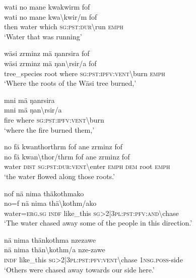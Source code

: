 \ea\label{ex:1:a3584}
wati no mane kwakwirm fof\\
\gll wati	no	mane	kwa{\textbackslash}kwir/m	fof\\
     then	water	which	\textsc{sg}:\textsc{pst}:\textsc{dur}{\textbackslash}run	\textsc{emph}\\
\glt `Water that was running'
\z

\ea\label{ex:1:a3585}
wäsi zrminz mä ŋanrsira fof\\
\gll wäsi	zrminz	mä	ŋan{\textbackslash}rsir/a	fof\\
     tree\_species	root	where	\textsc{sg}:\textsc{pst}:\textsc{ipfv}:\textsc{vent}{\textbackslash}burn	\textsc{emph}\\
\glt `Where the roots of the Wäsi tree burned,'
\z

\ea\label{ex:1:a3586}
mni mä ŋanrsira\\
\gll mni	mä	ŋan{\textbackslash}rsir/a\\
     fire	where	\textsc{sg}:\textsc{pst}:\textsc{ipfv}:\textsc{vent}{\textbackslash}burn\\
\glt `where the fire burned them,'
\z

\ea\label{ex:1:a3587}
no fä kwanthorthrm fof ane zrminz fof\\
\gll no	fä	kwan{\textbackslash}thor/thrm	fof	ane	zrminz	fof\\
     water	\textsc{dist}	\textsc{sg}:\textsc{pst}:\textsc{dur}:\textsc{vent}{\textbackslash}enter	\textsc{emph}	\textsc{dem}	root	\textsc{emph}\\
\glt `the water flowed along those roots.'
\z

\ea\label{ex:1:a3589}
nof nä nima thäkothmako\\
\gll no=f	nä	nima	thä{\textbackslash}kothm/ako\\
     water=\textsc{erg}.\textsc{sg}	\textsc{indf}	like\_this	\textsc{sg}>2|3\textsc{pl}:\textsc{pst}:\textsc{pfv}:\textsc{and}{\textbackslash}chase\\
\glt `The water chased away some of the people in this direction.'
\z

\ea\label{ex:1:a3590}
nä nima thänkothma nzezawe\\
\gll nä	nima	thän{\textbackslash}kothm/a	nze-zawe\\
     \textsc{indf}	like\_this	\textsc{sg}>2|3\textsc{pl}:\textsc{pst}:\textsc{pfv}:\textsc{vent}{\textbackslash}chase	1\textsc{nsg}.\textsc{poss}-side\\
\glt `Others were chased away towards our side here.'
\z

